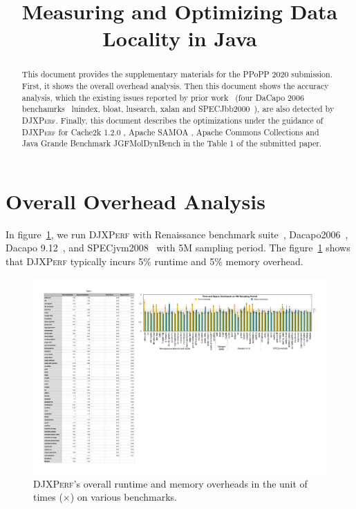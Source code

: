 \documentclass[sigconf,10pt,review,anonymous]{acmart}\settopmatter{printfolios=true,printccs=false,printacmref=false}
\newcommand{\tool}[0]{\mbox{\textsc{DJXPerf}}}
\begin{document}
\title{Measuring and Optimizing Data Locality in Java}

\begin{abstract}
This document provides the supplementary materials for the PPoPP 2020 submission. First, it shows the overall overhead analysis. Then this document shows the accuracy analysis, which the existing issues reported by prior work~\cite{Reusable} (four DaCapo 2006 benchamrks~\cite{dacapo} luindex, bloat, lusearch, xalan and SPECJbb2000~\cite{specjbb2000}), are also detected by \tool{}. Finally, this document describes the optimizations under the guidance of \tool{} for Cache2k 1.2.0 \cite{cache2k}, Apache SAMOA \cite{SAMOA}, Apache Commons Collections \cite{Commons} and Java Grande Benchmark JGFMolDynBench \cite{grande} in the Table 1 of the submitted paper.
\end{abstract}

\maketitle

\section{Overall Overhead Analysis}
In figure~\ref{overhead_plot_overall}, we run \tool{} with Renaissance benchmark suite~\cite{Prokopec:2019:RBS:3314221.3314637}, Dacapo2006~\cite{dacapo}, Dacapo 9.12~\cite{dacapo-9.12}, and SPECjvm2008~\cite{specjvm2008} with 5M sampling period. The figure~\ref{overhead_plot_overall} shows that \tool{} typically incurs 5\% runtime and 5\% memory overhead. 

\begin{figure}
\centering
\includegraphics[width=.8\textwidth]{images/overhead_plot_overall.pdf}
\caption{\tool{}'s overall runtime and memory overheads in the unit of times ($\times$) on various benchmarks.}
\label{overhead_plot_overall}
\end{figure}
\end{document}
